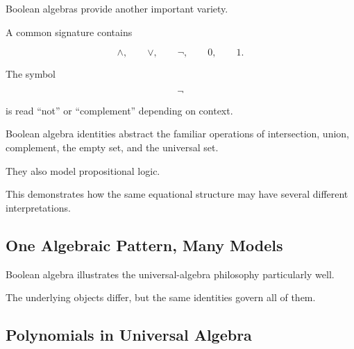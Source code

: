 Boolean algebras provide another important variety.

A common signature contains

\[ \wedge,\qquad\vee,\qquad\neg,\qquad0,\qquad1. \]

The symbol

\[ \neg \]

is read ``not'' or ``complement'' depending on context.

Boolean algebra identities abstract the familiar operations of intersection,
union, complement, the empty set, and the universal set.

They also model propositional logic.

This demonstrates how the same equational structure may have several
different interpretations.

\subsection{One Algebraic Pattern, Many Models}
\label{subsec:one-pattern-many-models}

Boolean algebra illustrates the universal-algebra philosophy particularly
well.

\begin{center}
\end{center}

The underlying objects differ, but the same identities govern all of them.

\subsection{Polynomials in Universal Algebra}
\label{subsec:universal-polynomials}

